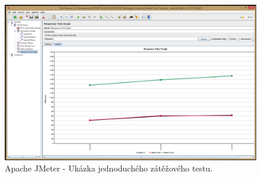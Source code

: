 \documentclass[thesis=M,czech]{FITthesis}[2014/05/6]
\begin{document}
\begin{figure}\centering
 	\includegraphics[width=1\textwidth]{images/prtsc/jmeter}
 	\caption[Apache JMeter - Ukázka jednoduchého zátěžového testu]{Apache JMeter - Ukázka jednoduchého zátěžového testu.\label{fig:jmeter}}
\end{figure}
\end{document}
